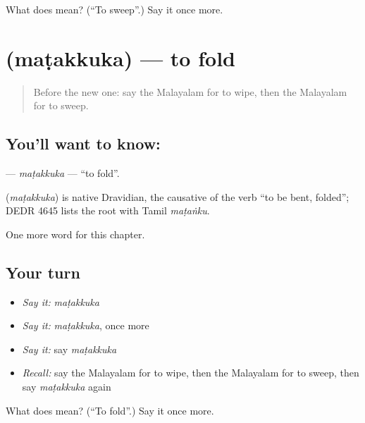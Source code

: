 \begin{tcolorbox}[breakable,colback=teal!4,colframe=teal!35!black,title={Before you move on}]
What does  mean? (\textquotedblleft{}To sweep\textquotedblright{}.) Say it once more.
\end{tcolorbox}
\section[\texorpdfstring{\ml{മടക്കുക} (maṭakkuka)}{മടക്കുക (maṭakkuka)}]{ (maṭakkuka) — to fold}

\label{lesson:ML-C264-matakkuka}



\begin{quote}
Before the new one: say the Malayalam for to wipe, then the Malayalam for to sweep.
\end{quote}

\subsection*{You'll want to know: }
\textbf{} — \emph{maṭakkuka} — \textquotedblleft{}to fold\textquotedblright{}.

\begin{cousinweb}
\textbf{} (\emph{maṭakkuka}) is native Dravidian, the causative of the verb \textquotedblleft{}to be bent, folded\textquotedblright{}; DEDR 4645 lists the root with Tamil \emph{maṭaṅku}.
\end{cousinweb}

\begin{grammarlens}[title={What you've built}]
One more word for this chapter.
\end{grammarlens}

\subsection*{Your turn}
\begin{itemize}
\raggedright
  \item \emph{Say it:} \emph{maṭakkuka}
  \item \emph{Say it:} \emph{maṭakkuka}, once more
  \item \emph{Say it:} say \emph{maṭakkuka}
  \item \emph{Recall:} say the Malayalam for to wipe, then the Malayalam for to sweep, then say \emph{maṭakkuka} again
\end{itemize}

\begin{tcolorbox}[breakable,colback=teal!4,colframe=teal!35!black,title={Before you move on}]
What does  mean? (\textquotedblleft{}To fold\textquotedblright{}.) Say it once more.
\end{tcolorbox}

